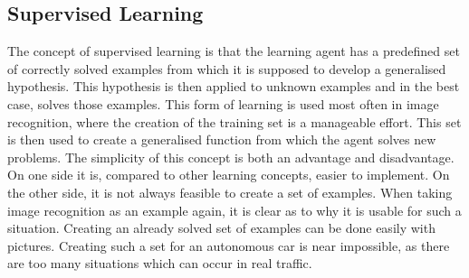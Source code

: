 \subsection{Supervised Learning}
The concept of supervised learning is that the learning agent has a predefined set of correctly solved examples from which it is supposed to develop a generalised hypothesis. This hypothesis is then applied to unknown examples and in the best case, solves those examples. This form of learning is used most often in image recognition, where the creation of the training set is  a manageable effort. This set is then used to create a generalised function from which the agent solves new problems. The simplicity of this concept is both an advantage and disadvantage. On one side it is, compared to other learning concepts, easier to implement. On the other side, it is not always feasible to create a set of examples. When taking image recognition as an example again, it is clear as to why it is usable for such a situation. Creating an already solved set of examples can be done easily with pictures. Creating such a set for an autonomous car is near impossible, as there are too many situations which can occur in real traffic. 